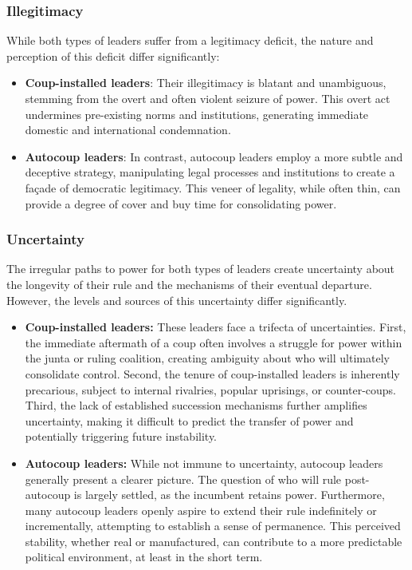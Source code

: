 \documentclass[
  12pt,
]{report}
\begin{document}
\subsubsection*{Illegitimacy}\label{illegitimacy}

While both types of leaders suffer from a legitimacy deficit, the nature
and perception of this deficit differ significantly:

\begin{itemize}
\item
  \textbf{Coup-installed leaders}: Their illegitimacy is blatant and
  unambiguous, stemming from the overt and often violent seizure of
  power. This overt act undermines pre-existing norms and institutions,
  generating immediate domestic and international condemnation.
\item
  \textbf{Autocoup leaders}: In contrast, autocoup leaders employ a more
  subtle and deceptive strategy, manipulating legal processes and
  institutions to create a façade of democratic legitimacy. This veneer
  of legality, while often thin, can provide a degree of cover and buy
  time for consolidating power.
\end{itemize}

\subsubsection*{Uncertainty}\label{uncertainty}

The irregular paths to power for both types of leaders create
uncertainty about the longevity of their rule and the mechanisms of
their eventual departure. However, the levels and sources of this
uncertainty differ significantly.

\begin{itemize}
\item
  \textbf{Coup-installed leaders:} These leaders face a trifecta of
  uncertainties. First, the immediate aftermath of a coup often involves
  a struggle for power within the junta or ruling coalition, creating
  ambiguity about who will ultimately consolidate control. Second, the
  tenure of coup-installed leaders is inherently precarious, subject to
  internal rivalries, popular uprisings, or counter-coups. Third, the
  lack of established succession mechanisms further amplifies
  uncertainty, making it difficult to predict the transfer of power and
  potentially triggering future instability.
\item
  \textbf{Autocoup leaders:} While not immune to uncertainty, autocoup
  leaders generally present a clearer picture. The question of who will
  rule post-autocoup is largely settled, as the incumbent retains power.
  Furthermore, many autocoup leaders openly aspire to extend their rule
  indefinitely or incrementally, attempting to establish a sense of
  permanence. This perceived stability, whether real or manufactured,
  can contribute to a more predictable political environment, at least
  in the short term.
\end{itemize}
\end{document}
